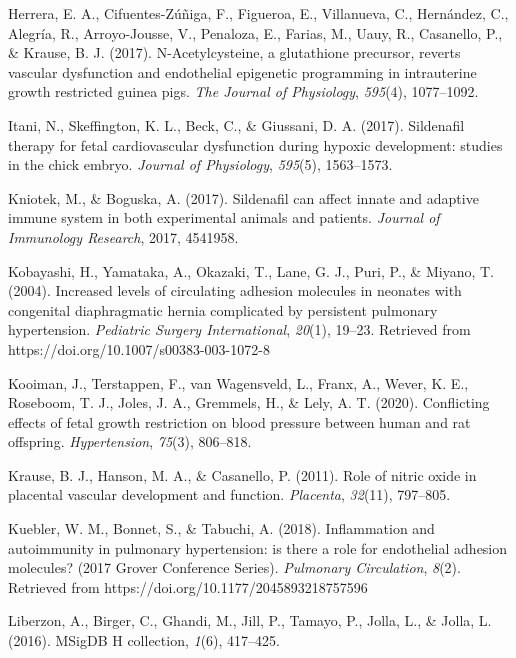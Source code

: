 \documentclass[authordate, empirical]{jote-new-article}
\begin{document}
	Herrera, E. A., Cifuentes-Zúñiga, F., Figueroa, E., Villanueva, C., Hernández, C., Alegría, R., Arroyo-Jousse, V., Penaloza, E., Farias, M., Uauy, R., Casanello, P., \& Krause, B. J. (2017). N-Acetylcysteine, a glutathione precursor, reverts vascular dysfunction and endothelial epigenetic programming in intrauterine growth restricted guinea pigs. \emph{The Journal of Physiology}, \emph{595}(4), 1077--1092.



	Itani, N., Skeffington, K. L., Beck, C., \& Giussani, D. A. (2017). Sildenafil therapy for fetal cardiovascular dysfunction during hypoxic development: studies in the chick embryo. \emph{Journal of Physiology}, \emph{595}(5), 1563--1573.



	Kniotek, M., \& Boguska, A. (2017). Sildenafil can affect innate and adaptive immune system in both experimental animals and patients. \emph{Journal of Immunology Research}, 2017, 4541958.



	Kobayashi, H., Yamataka, A., Okazaki, T., Lane, G. J., Puri, P., \& Miyano, T. (2004). Increased levels of circulating adhesion molecules in neonates with congenital diaphragmatic hernia complicated by persistent pulmonary hypertension. \emph{Pediatric Surgery International}, \emph{20}(1), 19--23. Retrieved from https://doi.org/10.1007/s00383-003-1072-8



	Kooiman, J., Terstappen, F., van Wagensveld, L., Franx, A., Wever, K. E., Roseboom, T. J., Joles, J. A., Gremmels, H., \& Lely, A. T. (2020). Conflicting effects of fetal growth restriction on blood pressure between human and rat offspring. \emph{Hypertension}, \emph{75}(3), 806--818.



	Krause, B. J., Hanson, M. A., \& Casanello, P. (2011). Role of nitric oxide in placental vascular development and function. \emph{Placenta}, \emph{32}(11), 797--805.



	Kuebler, W. M., Bonnet, S., \& Tabuchi, A. (2018). Inflammation and autoimmunity in pulmonary hypertension: is there a role for endothelial adhesion molecules? (2017 Grover Conference Series). \emph{Pulmonary Circulation}, \emph{8}(2). Retrieved from https://doi.org/10.1177/2045893218757596



	Liberzon, A., Birger, C., Ghandi, M., Jill, P., Tamayo, P., Jolla, L., \& Jolla, L. (2016). MSigDB H collection, \emph{1}(6), 417--425.
\end{document}
